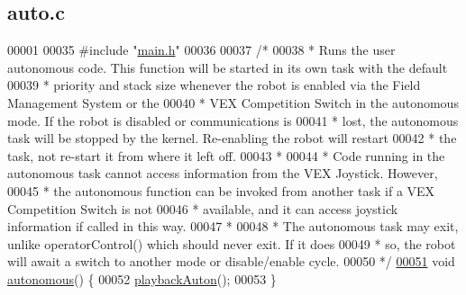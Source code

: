 \hypertarget{auto_8c_source}{}\subsection{auto.\+c}
\label{auto_8c_source}

\begin{DoxyCode}
00001 
00035 \textcolor{preprocessor}{#include "\hyperlink{main_8h}{main.h}"}
00036 
00037 \textcolor{comment}{/*}
00038 \textcolor{comment}{ * Runs the user autonomous code. This function will be started in its own task with the default}
00039 \textcolor{comment}{ * priority and stack size whenever the robot is enabled via the Field Management System or the}
00040 \textcolor{comment}{ * VEX Competition Switch in the autonomous mode. If the robot is disabled or communications is}
00041 \textcolor{comment}{ * lost, the autonomous task will be stopped by the kernel. Re-enabling the robot will restart}
00042 \textcolor{comment}{ * the task, not re-start it from where it left off.}
00043 \textcolor{comment}{ *}
00044 \textcolor{comment}{ * Code running in the autonomous task cannot access information from the VEX Joystick. However,}
00045 \textcolor{comment}{ * the autonomous function can be invoked from another task if a VEX Competition Switch is not}
00046 \textcolor{comment}{ * available, and it can access joystick information if called in this way.}
00047 \textcolor{comment}{ *}
00048 \textcolor{comment}{ * The autonomous task may exit, unlike operatorControl() which should never exit. If it does}
00049 \textcolor{comment}{ * so, the robot will await a switch to another mode or disable/enable cycle.}
00050 \textcolor{comment}{ */}
\hypertarget{auto_8c_source.tex_l00051}{}\hyperlink{main_8h_a3c7ca506bbc071fa740de13805b7f376}{00051} \textcolor{keywordtype}{void} \hyperlink{auto_8c_a3c7ca506bbc071fa740de13805b7f376}{autonomous}() \{
00052     \hyperlink{autonrecorder_8c_ae592a73a6bd9b2adcaa58a8ee82daaa0}{playbackAuton}();
00053 \}
\end{DoxyCode}
